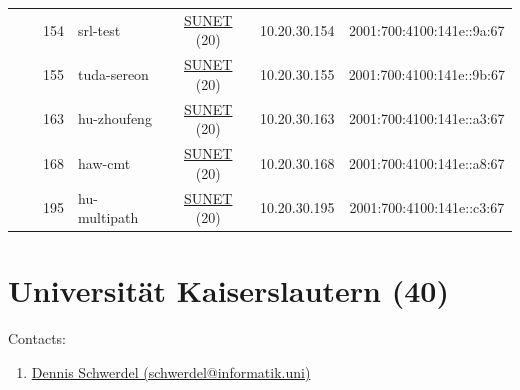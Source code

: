 \begin{small}
\begin{center}
\begin{longtable}{|c|c|c|c|c|c|c|c|}
  &  & \tiny{154} & \multicolumn{1}{|l|}{\tiny{srl-test}} & \multicolumn{2}{|c|}{\tiny{\href{http://www.sunet.se}{SUNET} (20)}} & \tiny{10.20.30.154} & \tiny{2001:700:4100:141e::9a:67} \\* \cline{3-3}\cline{4-4}\cline{5-5}\cline{6-6}\cline{7-7}\cline{8-8}
  &  & \tiny{155} & \multicolumn{1}{|l|}{\tiny{tuda-sereon}} & \multicolumn{2}{|c|}{\tiny{\href{http://www.sunet.se}{SUNET} (20)}} & \tiny{10.20.30.155} & \tiny{2001:700:4100:141e::9b:67} \\* \cline{3-3}\cline{4-4}\cline{5-5}\cline{6-6}\cline{7-7}\cline{8-8}
  &  & \tiny{163} & \multicolumn{1}{|l|}{\tiny{hu-zhoufeng}} & \multicolumn{2}{|c|}{\tiny{\href{http://www.sunet.se}{SUNET} (20)}} & \tiny{10.20.30.163} & \tiny{2001:700:4100:141e::a3:67} \\* \cline{3-3}\cline{4-4}\cline{5-5}\cline{6-6}\cline{7-7}\cline{8-8}
  &  & \tiny{168} & \multicolumn{1}{|l|}{\tiny{haw-cmt}} & \multicolumn{2}{|c|}{\tiny{\href{http://www.sunet.se}{SUNET} (20)}} & \tiny{10.20.30.168} & \tiny{2001:700:4100:141e::a8:67} \\* \cline{3-3}\cline{4-4}\cline{5-5}\cline{6-6}\cline{7-7}\cline{8-8}
  &  & \tiny{195} & \multicolumn{1}{|l|}{\tiny{hu-multipath}} & \multicolumn{2}{|c|}{\tiny{\href{http://www.sunet.se}{SUNET} (20)}} & \tiny{10.20.30.195} & \tiny{2001:700:4100:141e::c3:67} \\ \hline
\end{longtable}
\end{center}
\end{small}



\section{Universität Kaiserslautern (40)}
\label{sec:TUKL}

Contacts:\begin{enumerate}
 \item {}\href{mailto:schwerdel@informatik.uni}{Dennis Schwerdel (schwerdel@informatik.uni)}
\end{enumerate}

